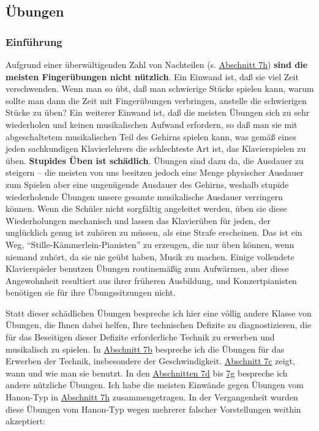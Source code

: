 
\subsection{Übungen}
\label{c1iii7}

\subsubsection{Einführung}
\label{c1iii7a}

Aufgrund einer überwältigenden Zahl von Nachteilen (s. \hyperref[c1iii7h]{Abschnitt 7h}) \textbf{sind die meisten Fingerübungen nicht nützlich}.
Ein Einwand ist, daß sie viel Zeit verschwenden.
Wenn man so übt, daß man schwierige Stücke spielen kann, warum sollte man dann die Zeit mit Fingerübungen verbringen, anstelle die schwierigen Stücke zu üben?
Ein weiterer Einwand ist, daß die meisten Übungen sich zu sehr wiederholen und keinen musikalischen Aufwand erfordern, so daß man sie mit abgeschaltetem musikalischen Teil des Gehirns spielen kann, was gemäß eines jeden sachkundigen Klavierlehrers die schlechteste Art ist, das Klavierspielen zu üben.
\textbf{Stupides Üben ist schädlich}.
Übungen sind dazu da, die Ausdauer zu steigern -- die meisten von uns besitzen jedoch eine Menge physischer Ausdauer zum Spielen aber eine ungenügende Ausdauer des Gehirns, weshalb stupide wiederholende Übungen unsere gesamte musikalische Ausdauer verringern können.
Wenn die Schüler nicht sorgfältig angeleitet werden, üben sie diese Wiederholungen mechanisch und lassen das Klavierüben für jeden, der unglücklich genug ist zuhören zu müssen, als eine Strafe erscheinen.
Das ist ein Weg, \enquote{Stille-Kämmerlein-Pianisten} zu erzeugen, die nur üben können, wenn niemand zuhört, da sie nie geübt haben, Musik zu machen.
Einige vollendete Klavierspieler benutzen Übungen routinemäßig zum Aufwärmen, aber diese Angewohnheit resultiert aus ihrer früheren Ausbildung, und Konzertpianisten benötigen sie für ihre Übungssitzungen nicht.

Statt dieser schädlichen Übungen bespreche ich hier eine völlig andere Klasse von Übungen, die Ihnen dabei helfen, Ihre technischen Defizite zu diagnostizieren, die für das Beseitigen dieser Defizite erforderliche Technik zu erwerben und musikalisch zu spielen.
In \hyperref[c1iii7b]{Abschnitt 7b} bespreche ich die Übungen für das Erwerben der Technik, insbesondere der Geschwindigkeit.
\hyperref[c1iii7c]{Abschnitt 7c} zeigt, wann und wie man sie benutzt.
In den \hyperref[c1iii7d]{Abschnitten 7d} bis \hyperref[c1iii7g]{7g} bespreche ich andere nützliche Übungen.
Ich habe die meisten Einwände gegen Übungen vom Hanon-Typ in \hyperref[c1iii7h]{Abschnitt 7h} zusammengetragen.
In der Vergangenheit wurden diese Übungen vom Hanon-Typ wegen mehrerer falscher Vorstellungen weithin akzeptiert:

